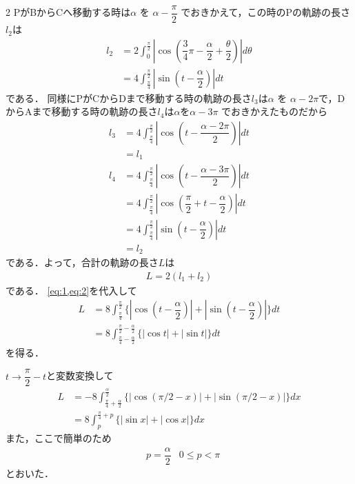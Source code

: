 \documentclass[../../main.tex]{subfiles}
\begin{document}
\begin{multicols}{2}
  PがBからCへ移動する時は$\alpha$ を $\alpha - \dfrac{\pi}{2}$ でおきかえて，この時のPの軌跡の長さ$l_2$は
  \begin{align}
    l_2
    & = 2 \int_{0}^{\frac{\pi}{2}} |\cos(\dfrac{3}{4}\pi - \dfrac{\alpha}{2} + \dfrac{\theta}{2})| d\theta \\
    & = 4 \int_{\frac{\pi}{4}}^{\frac{\pi}{2}} |\sin(t-\dfrac{\alpha}{2})| dt \label{eq:2}
  \end{align}
  である．
  同様にPがCからDまで移動する時の軌跡の長さ$l_3$は$\alpha$ を $\alpha - 2\pi$で，DからAまで移動する時の軌跡の長さ$l_4$は$\alpha$を$\alpha - 3\pi$ でおきかえたものだから
  \begin{align}
    l_3
    & =  4 \int_{\frac{\pi}{4}}^{\frac{\pi}{2}} |\cos(t-\dfrac{\alpha-2\pi}{2})| dt         \\
    & = l_1                                                                                \\
    l_4
    & = 4 \int_{\frac{\pi}{4}}^{\frac{\pi}{2}} |\cos(t-\dfrac{\alpha-3\pi}{2})| dt          \\
    & = 4 \int_{\frac{\pi}{4}}^{\frac{\pi}{2}} |\cos(\dfrac{\pi}{2}+t-\dfrac{\alpha}{2})| dt \\
    & = 4 \int_{\frac{\pi}{4}}^{\frac{\pi}{2}} |\sin(t-\dfrac{\alpha}{2})| dt               \\
    & = l_2
  \end{align}
  である．よって，合計の軌跡の長さ$L$は
  \begin{align}
    L = 2(l_1+l_2) \label{eq:3}
  \end{align}
  である．
  \cref{eq:1,eq:2}を代入して
  \begin{align}
    L
    & = 8\int_{\frac{\pi}{4}}^{\frac{\pi}{2}} \{|\cos(t-\dfrac{\alpha}{2})| + |\sin(t-\dfrac{\alpha}{2})|\} dt \\
    & = 8\int_{\frac{\pi}{4}-\frac{\alpha}{2}}^{\frac{\pi}{2}-\frac{\alpha}{2}} \{|\cos t| + |\sin t |\} dt
  \end{align}
  を得る．

  $t \to \dfrac{\pi}{2}-t$と変数変換して
  \begin{align}
    L
    & = -8\int_{\frac{\pi}{4}+\frac{\alpha}{2}}^{\frac{\alpha}{2}} \{|\cos (\pi/2-x)| + |\sin (\pi/2-x) |\} dx \\
    & = 8\int_{p}^{\frac{\pi}{4}+p} \{|\sin x| + |\cos x|\} dx
  \end{align}
  また，ここで簡単のため
  \begin{align}
    & p = \dfrac{\alpha}{2} & 0 \le p < \pi
  \end{align}
  とおいた．


\end{multicols}
\end{document}
